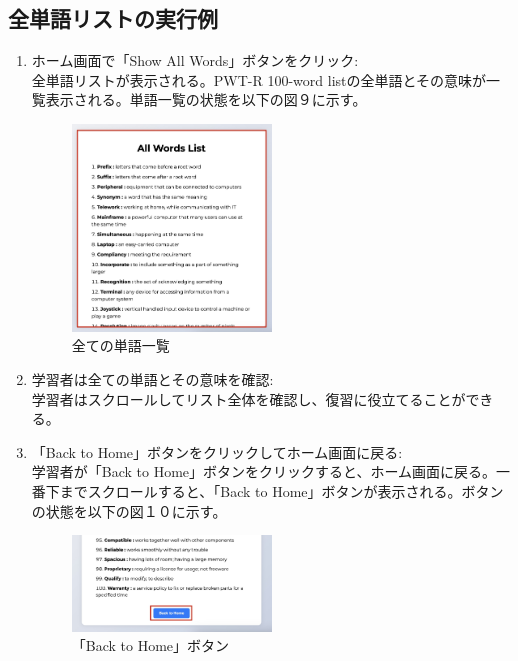 \documentclass[]{jsarticle}
\begin{document}
\subsection{全単語リストの実行例}

\begin{enumerate}
    \item ホーム画面で「Show All Words」ボタンをクリック:\\
        全単語リストが表示される。PWT-R 100-word listの全単語とその意味が一覧表示される。単語一覧の状態を以下の図９に示す。
        
        \begin{figure}[H]
        \centering
        \includegraphics[width=0.5\textwidth]{show-all-words.jpg}
        \caption{全ての単語一覧}
        \end{figure}

    \item 学習者は全ての単語とその意味を確認:\\
        学習者はスクロールしてリスト全体を確認し、復習に役立てることができる。\\

    \item 「Back to Home」ボタンをクリックしてホーム画面に戻る:\\
        学習者が「Back to Home」ボタンをクリックすると、ホーム画面に戻る。一番下までスクロールすると、「Back to Home」ボタンが表示される。ボタンの状態を以下の図１０に示す。
        
        \begin{figure}[H]
        \centering
        \includegraphics[width=0.5\textwidth]{all-words-back-to-home.jpg}
        \caption{「Back to Home」ボタン}
        \end{figure}
\end{enumerate}
\end{document}
